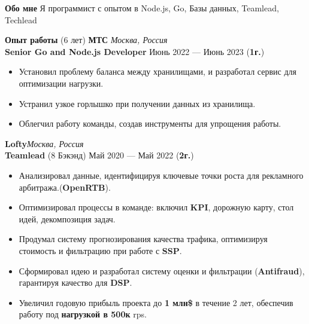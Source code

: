 \documentclass{resume}
\begin{document}
\begin{rSection}{\textbf{Обо мне}}
{
    Я программист с опытом в Node.js, Go, Базы данных, Teamlead, Techlead
}

\end{rSection}
\begin{rSection}{\textbf{Опыт работы} (6 лет) }
    \textbf{МТС} \hfill \textit{Москва, Россия} \\
    \textbf{Senior Go and Node.js Developer}  \hfill Июнь 2022 --- Июнь 2023 ({\textbf{1г.}})
    \begin{itemize}
        \item Установил проблему баланса между хранилищами, и разработал сервис для оптимизации  нагрузки.
        \item Устранил узкое горлышко при получении данных из хранилища.
        \item Облегчил работу команды, создав инструменты для упрощения работы.
    \end{itemize}

    \textbf{Lofty}\hfill \textit{Москва, Россия} \\
    \textbf{Teamlead} (8 Бэкэнд) \hfill Май 2020 --- Май 2022 ({\textbf{2г.}})
    \begin{itemize}
        \item Анализировал данные, идентифицируя ключевые точки роста для рекламного арбитража.(\textbf{OpenRTB})\@.
        \item Оптимизировал процессы в команде: включил \textbf{KPI}, дорожную карту, стол идей, декомпозиция задач\@.
        \item Продумал систему прогнозирования качества трафика, оптимизируя стоимость и фильтрацию при работе с \textbf{SSP}\@.
        \item Сформировал идею и разработал систему оценки и фильтрации (\textbf{Antifraud}), гарантируя качество для \textbf{DSP}\@.
        \item Увеличил годовую прибыль проекта до \textbf{1 млн\$} в течение 2 лет, обеспечив работу под \textbf{нагрузкой в 500к} rps\@.
    \end{itemize}


\end{rSection}
\end{document}
